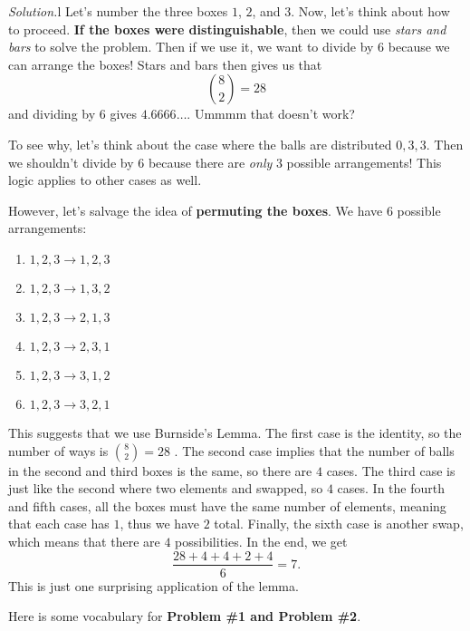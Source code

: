\documentclass[11pt]{scrartcl}
\begin{document}
\color{orange} \textit{Solution.}\color{black}\color{white}l\color{black} Let's number the three boxes $1$, $2$, and $3$. Now, let's think about how to proceed. \color{blue} \textbf{If the boxes were distinguishable}\color{black}, then we could use \textit{stars and bars} to solve the problem. Then if we use it, we want to divide by $6$ because we can arrange the boxes! Stars and bars then gives us that \[\binom{8}{2} = 28\] and dividing by $6$ gives $4.6666\dots$. Ummmm that doesn't work?
\vspace{0.1cm}

To see why, let's think about the case where the balls are distributed $0,3,3$. Then we shouldn't divide by $6$ because there are \textit{only} $3$ possible arrangements! This logic applies to other cases as well.
\vspace{0.1cm}

However, let's salvage the idea of \color{blue} \textbf{permuting the boxes}\color{black}. We have $6$ possible arrangements:
\begin{enumerate}
    \item $1,2,3 \rightarrow 1,2,3$
    \item $1,2,3 \rightarrow 1,3,2$
    \item $1,2,3 \rightarrow 2,1,3$
    \item $1,2,3 \rightarrow 2,3,1$
    \item $1,2,3 \rightarrow 3,1,2$
    \item $1,2,3 \rightarrow 3,2,1$
\end{enumerate}

This suggests that we use Burnside's Lemma. The first case is the identity, so the number of ways is \boldmath $\binom{8}{2}=28$ \unboldmath. The second case implies that the number of balls in the second and third boxes is the same, so there are \boldmath $4$ \unboldmath cases. The third case is just like the second where two elements and swapped, so \boldmath $4$ \unboldmath cases. In the fourth and fifth cases, all the boxes must have the same number of elements, meaning that each case has $1$, thus we have \boldmath $2$ \unboldmath total. Finally, the sixth case is another swap, which means that there are \boldmath $4$ \unboldmath possibilities. In the end, we get \[\dfrac{28+4+4+2+4}{6} = \boxed{7}.\] This is just one surprising application of the lemma.

\vspace{0.5cm}

Here is some vocabulary for \textbf{Problem \#1 and Problem \#2}.
\end{document}
